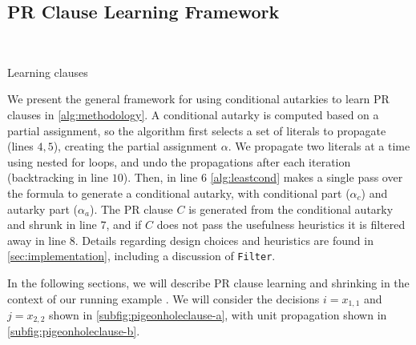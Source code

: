 \subsection{PR Clause Learning Framework}~\label{subsec:methodology}

\begin{algorithm}\caption{Learning \pr clauses}\label{alg:methodology}
    \SetAlgoNoLine
\end{algorithm}

We present the general framework for using conditional autarkies to learn PR clauses in \autoref{alg:methodology}. 
A conditional autarky is computed based on a partial assignment, 
so the algorithm first selects a set of literals to propagate (lines $4,5$), creating the partial assignment $\alpha$.
We propagate two literals at a time using nested for loops, and undo the propagations after each iteration (backtracking in line $10$).
Then, in line $6$ \autoref{alg:leastcond} makes a single pass over the formula to generate a conditional autarky, with conditional part ($\alpha_c$) and autarky part ($\alpha_a$).
The PR clause $C$ is generated from the conditional autarky and shrunk in line $7$, and if $C$ does not pass the usefulness heuristics it is filtered away in line $8$. 
Details regarding design choices and heuristics are found in \autoref{sec:implementation}, including a discussion of \texttt{Filter}.

In the following sections, we will describe PR clause learning and shrinking in the context of our running example  .
We will consider the decisions $i = x_{1, 1}$ and $j = x_{2, 2}$ shown in \autoref{subfig:pigeonholeclause-a}, with unit propagation shown in \autoref{subfig:pigeonholeclause-b}.

